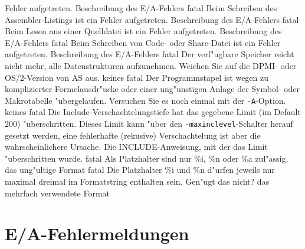 \documentclass[12pt,a4paper,twoside]{report}
\newcommand{\tty}[1]{{\tt #1}}
\newcommand{\asname}{AS}
\begin{document}
\begin{description}
{                Fehler aufgetreten.}
               {Beschreibung des E/A-Fehlers}
               {fatal}
               {Beim Schreiben des Assembler-Listings ist ein
                Fehler aufgetreten.}
               {Beschreibung des E/A-Fehlers}
               {fatal}
               {Beim Lesen aus einer Quelldatei ist ein
                Fehler aufgetreten.}
               {Beschreibung des E/A-Fehlers}
               {fatal}
               {Beim Schreiben von Code- oder Share-Datei
                ist ein Fehler aufgetreten.}
               {Beschreibung des E/A-Fehlers}
               {fatal}
               {Der verf"ugbare Speicher reicht nicht mehr,
	        alle Datenstrukturen aufzunehmen.  Weichen Sie auf die
	        DPMI- oder OS/2-Version von \asname{} aus.}
               {keines}
               {fatal}
               {Der Programmstapel ist wegen zu komplizierter
	        Formelausdr"ucke oder einer ung"unstigen Anlage der Symbol-
	        oder Makrotabelle "ubergelaufen.  Versuchen Sie es noch
	        einmal mit der \tty{-A}-Option.}
               {keines}
               {fatal}
               {Die Include-Verschachtelungstiefe hat das gegebene Limit
                (im Default 200) "uberschritten.  Dieses Limit kann "uber
                den {\tt -maxinclevel}-Schalter herauf gesetzt werden, eine
                fehlerhafte (rekusive) Verschachtelung ist aber die
                wahrscheinlichere Ursache.}
               {Die INCLUDE-Anweisung, mit der das Limit "uberschritten wurde.}
               {fatal}
               {Als Platzhalter sind nur \%i, \%n oder \%a zul"assig.}
               {das ung"ultige Format}
               {fatal}
               {Die Platzhalter \%i und \%n d"urfen jeweils nur maximal dreimal
                im Formatstring enthalten sein.  Gen"ugt das nicht?}
               {das mehrfach verwendete Format}
\end{description}


\cleardoublepage
\chapter{E/A-Fehlermeldungen}
\end{document}
